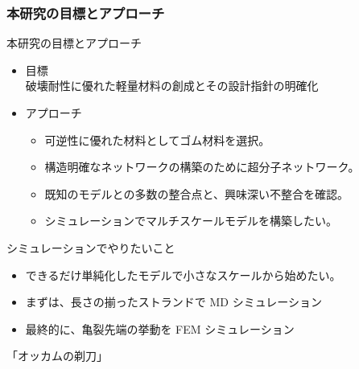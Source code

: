 \documentclass[11pt, dvipdfmx]{beamer}
\begin{document}
\begin{frame}
\frametitle{本研究の目標とアプローチ}
\vspace{-2mm}
\begin{exampleblock}{本研究の目標とアプローチ}
\begin{itemize}
\item
目標\\
破壊耐性に優れた軽量材料の創成とその設計指針の明確化
\item
アプローチ
	\begin{itemize}
	\item
	可逆性に優れた材料としてゴム材料を選択。
	\item
	構造明確なネットワークの構築のために超分子ネットワーク。
	\item
	既知のモデルとの\color{red}多数の整合点と、興味深い不整合\color{black}を確認。
	\item
	\color{red}シミュレーションでマルチスケールモデル\color{black}を構築したい。
	\end{itemize}
\end{itemize}
\end{exampleblock}
\vspace{-2mm}
\begin{alertblock}{シミュレーションでやりたいこと}
\begin{itemize}
\item
できるだけ\alert{単純化したモデルで小さなスケール}から始めたい。
\item
まずは、長さの揃ったストランドで MD シミュレーション
\item
最終的に、亀裂先端の挙動を FEM シミュレーション
\end{itemize}
\centering
{\color{red}\Large「オッカムの剃刀」}
\end{alertblock}
\end{frame}
\end{document}
